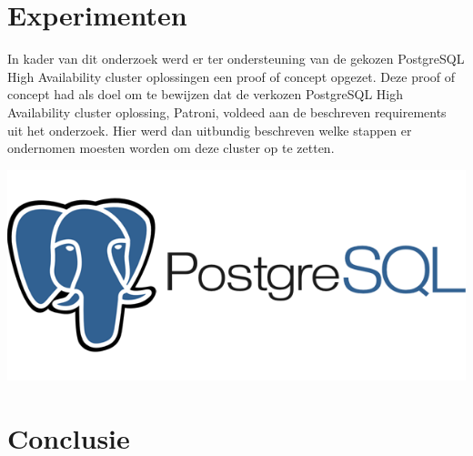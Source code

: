 \documentclass[a0,portrait]{a0poster}
\begin{document}
\begin{multicols}{2}

\color{Black} %
\color{HoGentAccent1} 
\section*{Experimenten}
\color{black}
In kader van dit onderzoek werd er ter ondersteuning van de gekozen PostgreSQL High Availability cluster oplossingen een proof of concept opgezet. Deze proof of concept had als doel om te bewijzen dat de verkozen PostgreSQL High Availability cluster oplossing, Patroni, voldeed aan de beschreven requirements uit het onderzoek.
Hier werd dan uitbundig beschreven welke stappen er ondernomen moesten worden om deze cluster op te zetten.




\begin{center}\vspace{1cm}
\includegraphics[width=1.0\linewidth]{postgres}
\end{center}\vspace{1cm}




\color{HoGentAccent1} 
\section*{Conclusie}
\color{black}


\end{multicols}
\end{document}
